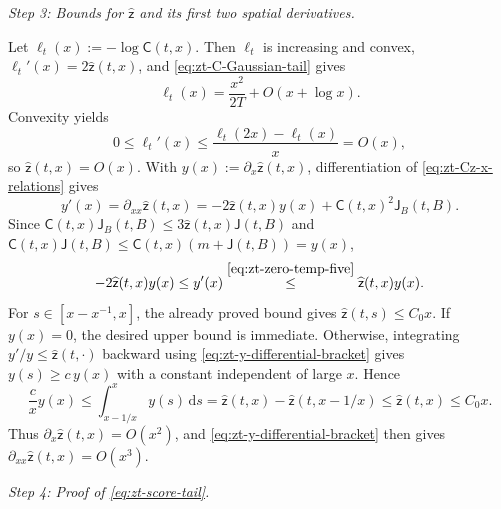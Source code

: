 \documentclass[10pt]{amsart}
\theoremstyle{definition}
\theoremstyle{remark}
\numberwithin{equation}{section}
\newcommand{\1}{\mathbf 1}
\newcommand{\dd}{\,\mathrm d}
\newcommand{\stackref}[2]{\stackrel{#2}{#1}}
\begin{document}
\smallskip
\noindent\emph{Step 3: Bounds for $\widehat{\mathsf z}$ and its first two spatial derivatives.}

Let $\ell_t(x):=-\log\mathsf C(t,x)$. Then $\ell_t$ is increasing and convex, $\ell_t'(x)=2\widehat{\mathsf z}(t,x)$, and \eqref{eq:zt-C-Gaussian-tail} gives
\begin{equation*}
 \ell_t(x)=\frac{x^2}{2T}+O(x+\log x).
\end{equation*}
Convexity yields
\begin{equation*}
 0\leq\ell_t'(x)\leq\frac{\ell_t(2x)-\ell_t(x)}x=O(x),
\end{equation*}
so $\widehat{\mathsf z}(t,x)=O(x)$. With $y(x):=\partial_x\widehat{\mathsf z}(t,x)$, differentiation of \eqref{eq:zt-Cz-x-relations} gives
\begin{equation*}
 y'(x)=\partial_{xx}\widehat{\mathsf z}(t,x)
 =-2\widehat{\mathsf z}(t,x)y(x)+\mathsf C(t,x)^2\mathsf J_B(t,B).
\end{equation*}
Since $\mathsf C(t,x)\mathsf J_B(t,B)\leq3\widehat{\mathsf z}(t,x)\mathsf J(t,B)$ and $\mathsf C(t,x)\mathsf J(t,B)\leq\mathsf C(t,x)(m+\mathsf J(t,B))=y(x)$,
\begin{equation}
 -2\widehat{\mathsf z}(t,x)y(x)
 \leq y'(x)
 \stackref{\leq}{\eqref{eq:zt-zero-temp-five}}
 \widehat{\mathsf z}(t,x)y(x).
 \label{eq:zt-y-differential-bracket}
\end{equation}
For $s\in[x-x^{-1},x]$, the already proved bound gives $\widehat{\mathsf z}(t,s)\leq C_0x$. If $y(x)=0$, the desired upper bound is immediate. Otherwise, integrating $y'/y\leq\widehat{\mathsf z}(t,\cdot)$ backward using \eqref{eq:zt-y-differential-bracket} gives $y(s)\geq c\,y(x)$ with a constant independent of large $x$. Hence
\begin{equation*}
 \frac{c}{x}y(x)\leq\int_{x-1/x}^xy(s)\dd s
 =\widehat{\mathsf z}(t,x)-\widehat{\mathsf z}(t,x-1/x)\leq\widehat{\mathsf z}(t,x)\leq C_0x.
\end{equation*}
Thus $\partial_x\widehat{\mathsf z}(t,x)=O(x^2)$, and \eqref{eq:zt-y-differential-bracket} then gives $\partial_{xx}\widehat{\mathsf z}(t,x)=O(x^3)$.

\smallskip
\noindent\emph{Step 4: Proof of \eqref{eq:zt-score-tail}.}
\end{document}
